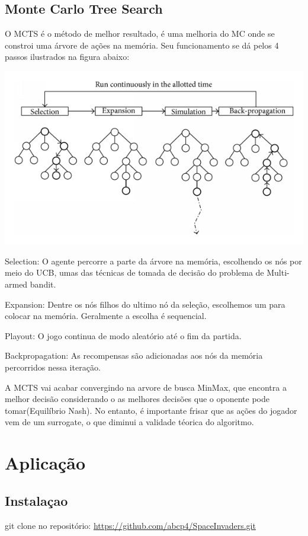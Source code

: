 \documentclass[]{book}
\begin{document}
\section{Monte Carlo Tree Search}\label{monte-carlo-tree-search}

O MCTS \citep{browne2012survey} é o método de melhor resultado, é uma
melhoria do MC onde se constroi uma árvore de ações na memória. Seu
funcionamento se dá pelos 4 passos ilustrados na figura abaixo:

\begin{center}\includegraphics[width=0.5\linewidth]{content/imgs/MCTS} \end{center}

Selection: O agente percorre a parte da árvore na memória, escolhendo os
nós por meio do UCB, umas das técnicas de tomada de decisão do problema
de Multi-armed bandit.

Expansion: Dentre os nós filhos do ultimo nó da seleção, escolhemos um
para colocar na memória. Geralmente a escolha é sequencial.

Playout: O jogo continua de modo aleatório até o fim da partida.

Backpropagation: As recompensas são adicionadas aos nós da memória
percorridos nessa iteração.

A MCTS vai acabar convergindo na arvore de busca MinMax, que encontra a
melhor decisão considerando o as melhores decisões que o oponente pode
tomar(Equilíbrio Nash). No entanto, é importante frisar que as ações do
jogador vem de um surrogate, o que diminui a validade téorica do
algoritmo.

\chapter{Aplicação}\label{app}

\section{Instalaçao}\label{instalauxe7ao}

git clone no repositório:
\url{https://github.com/abcp4/SpaceInvaders.git}
\end{document}
